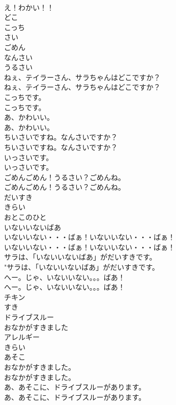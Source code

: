\documentclass[8pt]{extreport}
\begin{document}
\begin{CJK}{UTF8}{min}
\\	え！わかい！！ 
\\	どこ
\\	こっち
\\	さい
\\	ごめん
\\	なんさい
\\	うるさい
\\	ねぇ、テイラーさん、サラちゃんはどこですか？	
\\	ねぇ、テイラーさん、サラちゃんはどこですか？ 
\\	こっちです。	
\\	こっちです。 
\\	あ、かわいい。	
\\	あ、かわいい。 
\\	ちいさいですね。なんさいですか？	
\\	ちいさいですね。なんさいですか？ 
\\	いっさいです。	
\\	いっさいです。 
\\	ごめんごめん！うるさい？ごめんね。	
\\	ごめんごめん！うるさい？ごめんね。 
\\	だいすき
\\	きらい
\\	おとこのひと
\\	いないいないばあ
\\	いないいない・・・ばぁ！いないいない・・・ばぁ！	
\\	いないいない・・・ばぁ！いないいない・・・ばぁ！ 
\\	サラは、「いないいないばあ」がだいすきです。	
\\	"サラは、「いないいないばあ」がだいすきです。 
\\	へー。じゃ、いないいない。。。ばあ！	
\\	へー。じゃ、いないいない。。。ばあ！ 
\\	チキン
\\	すき
\\	ドライブスルー
\\	おなかがすきました
\\	アレルギー
\\	きらい
\\	あそこ
\\	おなかがすきました。
\\	おなかがすきました。
\\	あ、あそこに、ドライブスルーがあります。	
\\	あ、あそこに、ドライブスルーがあります。 

\end{CJK}
\end{document}
